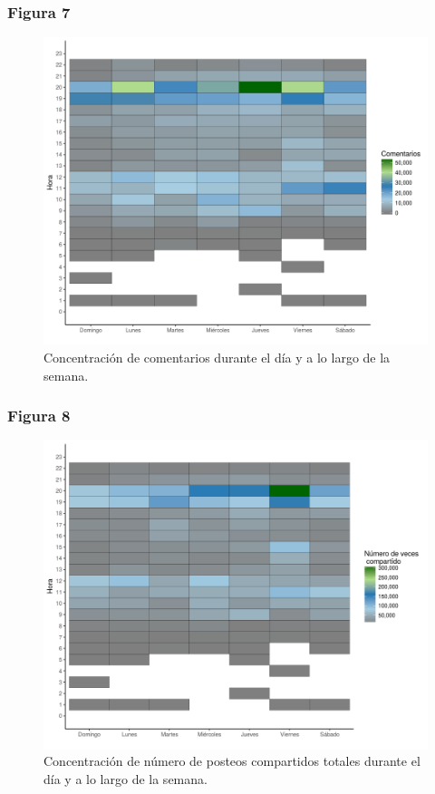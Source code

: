 \documentclass[a4paper,10pt]{article}
\begin{document}
\subsubsection{Figura 7}
\begin{figure}[H]
  \begin{center}
   \includegraphics[width=.85\textwidth]{imagenes/figura7.png}
   \captionsetup{width=.80\textwidth}
   \caption{\centering Concentración de comentarios durante el día y a 
   lo largo de la semana.} 
  \end{center} 
\end{figure}

\subsubsection{Figura 8}
\begin{figure}[H]
  \begin{center}
   \includegraphics[width=.85\textwidth]{imagenes/figura8.png}
      \captionsetup{width=.80\textwidth}
   \caption{\centering Concentración de número de posteos compartidos totales durante el día y a 
   lo largo de la semana.} 
  \end{center} 
\end{figure}
\end{document}
